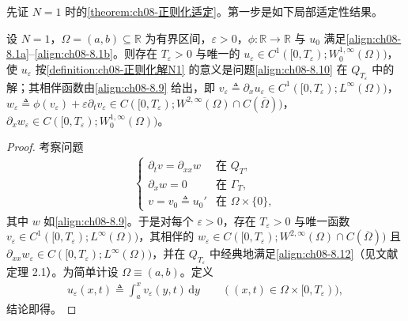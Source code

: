 \documentclass[../../main.tex]{subfiles}%
\begin{document}
先证 $N=1$ 时的\cref{theorem:ch08-正则化适定}。第一步是如下局部适定性结果。

\begin{lemma}[局部适定性]\label{lemma:ch08-局部适定N1}
设 $N=1$，$\Omega=(a,b)\subseteq\mathbb{R}$ 为有界区间，$\varepsilon>0$，$\phi:\mathbb{R}\to\mathbb{R}$ 与 $u_0$ 满足\eqref{align:ch08-8.1a}--\eqref{align:ch08-8.1b}。则存在 $T_\varepsilon>0$ 与唯一的 $u_\varepsilon\in C^1([0,T_\varepsilon);W^{1,\infty}_0(\Omega))$，使 $u_\varepsilon$ 按\cref{definition:ch08-正则化解N1} 的意义是问题\eqref{align:ch08-8.10} 在 $Q_{T_\varepsilon}$ 中的解；其相伴函数由\eqref{align:ch08-8.9} 给出，即 $v_\varepsilon\triangleq\partial_xu_\varepsilon\in C^1([0,T_\varepsilon);L^\infty(\Omega))$，$w_\varepsilon\triangleq\phi(v_\varepsilon)+\varepsilon\partial_tv_\varepsilon\in C([0,T_\varepsilon);W^{2,\infty}(\Omega)\cap C(\overline\Omega))$，$\partial_xw_\varepsilon\in C([0,T_\varepsilon);W^{1,\infty}_0(\Omega))$。
\end{lemma}

\begin{proof}
考察问题
\begin{align}\label{align:ch08-8.12}
\begin{cases}
\partial_tv=\partial_{xx}w & \text{在 }Q_T,\\
\partial_xw=0 & \text{在 }\Gamma_T,\\
v=v_0\triangleq u_0' & \text{在 }\Omega\times\{0\},
\end{cases}
\end{align}
其中 $w$ 如\eqref{align:ch08-8.9}。于是对每个 $\varepsilon>0$，存在 $T_\varepsilon>0$ 与唯一函数 $v_\varepsilon\in C^1([0,T_\varepsilon);L^\infty(\Omega))$，其相伴的 $w_\varepsilon\in C([0,T_\varepsilon);W^{2,\infty}(\Omega)\cap C(\overline\Omega))$ 且 $\partial_{xx}w_\varepsilon\in C([0,T_\varepsilon);L^\infty(\Omega))$，并在 $Q_{T_\varepsilon}$ 中经典地满足\eqref{align:ch08-8.12}（见文献~\cite{ref74} 定理 2.1）。为简单计设 $\Omega\equiv(a,b)$。定义
\begin{align}
u_\varepsilon(x,t)\triangleq \int_a^x v_\varepsilon(y,t)\,\mathrm{d}y\qquad((x,t)\in\Omega\times[0,T_\varepsilon)), \label{align:ch08-8.13}
\end{align}
结论即得。
\end{proof}
\end{document}
